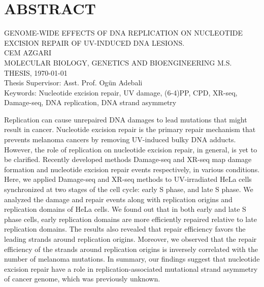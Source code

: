 \setcounter{page}{3}
\chapter*{\vspace{-4\baselineskip} \bf ABSTRACT} 

\begin{center}
\MakeUppercase{GENOME-WIDE EFFECTS OF DNA REPLICATION ON
NUCLEOTIDE EXCISION REPAIR OF UV-INDUCED
DNA LESIONS.} \\[3\baselineskip]
\MakeUppercase{Cem Azgari} \\[\baselineskip]
MOLECULAR BIOLOGY, GENETICS AND BIOENGINEERING M.S. THESIS, \Cemdateformat\today \\[\baselineskip]
Thesis Supervisor: Asst. Prof. Ogün Adebali \\[2\baselineskip]
Keywords: Nucleotide excision repair, UV damage, (6-4)PP, CPD, XR-seq, Damage-seq, DNA replication, DNA strand asymmetry \\[2\baselineskip]
\end{center}

\singlespacing
Replication can cause unrepaired DNA damages to lead mutations that might result in cancer. Nucleotide excision repair is the primary repair mechanism that prevents melanoma cancers by removing UV-induced bulky DNA adducts. However, the role of replication on nucleotide excision repair, in general, is yet to be clarified. Recently developed methods Damage-seq and XR-seq map damage formation and nucleotide excision repair events respectively, in various conditions. Here, we applied Damage-seq and XR-seq methods to UV-irradiated HeLa cells synchronized at two stages of the cell cycle: early S phase, and late S phase. We analyzed the damage and repair events along with replication origins and replication domains of HeLa cells. We found out that in both early and late S phase cells, early replication domains are more efficiently repaired relative to late replication domains. The results also revealed that repair efficiency favors the leading strands around replication origins. Moreover, we observed that the repair efficiency of the strands around replication origins is inversely correlated with the number of melanoma mutations. In summary, our findings suggest that nucleotide excision repair have a role in replication-associated mutational strand asymmetry of cancer genome, which was previously unknown.

\clearpage\pagebreak
\onehalfspacing
